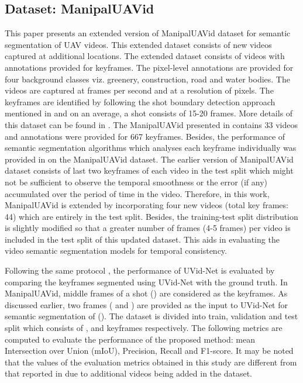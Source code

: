 \documentclass[journal]{IEEEtran}
\begin{document}
\subsection{Dataset: ManipalUAVid}
\par This paper presents an extended version of ManipalUAVid \cite{19} dataset for semantic segmentation of UAV videos. This extended dataset consists of new videos captured at additional locations. The extended dataset consists of  videos with annotations provided for  keyframes. The pixel-level annotations are provided for four background classes viz. greenery, construction, road and water bodies. The videos are captured at  frames per second and at a resolution of  pixels. The keyframes are identified by following the shot boundary detection approach mentioned in \cite{19} and on an average, a shot consists of 15-20  frames. More details of this dataset can be found in \cite{19}.  The ManipalUAVid presented in \cite{19} contains 33 videos and annotations were provided for 667 keyframes.  Besides, the performance of semantic segmentation algorithms which analyses each keyframe individually was provided in \cite{19} on the ManipalUAVid dataset. The earlier version of ManipalUAVid dataset \cite{19} consists of last two keyframes of each video in the test split which might not be sufficient to observe the temporal smoothness or the error (if any) accumulated over the period of time in the video. Therefore, in this work, ManipalUAVid is extended by incorporating four new videos (total key frames: 44) which are entirely in the test split. Besides, the training-test split distribution is slightly modified so that a greater number of frames (4-5 frames) per video is included in the test split of this updated dataset. This aids in evaluating the video semantic segmentation models for temporal consistency. 


\par Following the same protocol \cite{19}, the performance of UVid-Net is evaluated by comparing the keyframes segmented using UVid-Net with the ground truth. In ManipalUAVid, middle frames of a shot () are considered as the keyframes.  As discussed earlier, two frames ( and  ) are provided as the input to UVid-Net for semantic segmentation  of  (). The dataset is divided into train, validation and test split which consists of ,  and  keyframes respectively. The following metrics are computed to evaluate the performance of the proposed method: mean Intersection over Union (mIoU), Precision, Recall and F1-score.  It may be noted that the values of the evaluation metrics obtained in this study are different from that reported in \cite{19} due to additional videos being added in the dataset. 
\end{document}
